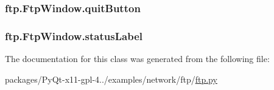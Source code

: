 \subsubsection[{quit\+Button}]{\setlength{\rightskip}{0pt plus 5cm}ftp.\+Ftp\+Window.\+quit\+Button}\label{classftp_1_1FtpWindow_a4837742746738531e687209799069d4e}
\hypertarget{classftp_1_1FtpWindow_abd87eea61cd6409f2d3ba0e88632d1f0}{}
\subsubsection[{status\+Label}]{\setlength{\rightskip}{0pt plus 5cm}ftp.\+Ftp\+Window.\+status\+Label}\label{classftp_1_1FtpWindow_abd87eea61cd6409f2d3ba0e88632d1f0}


The documentation for this class was generated from the following file\+:\begin{DoxyCompactItemize}
\item 
packages/\+Py\+Qt-\/x11-\/gpl-\/4../examples/network/ftp/\hyperlink{ftp_8py}{ftp.\+py}\end{DoxyCompactItemize}
